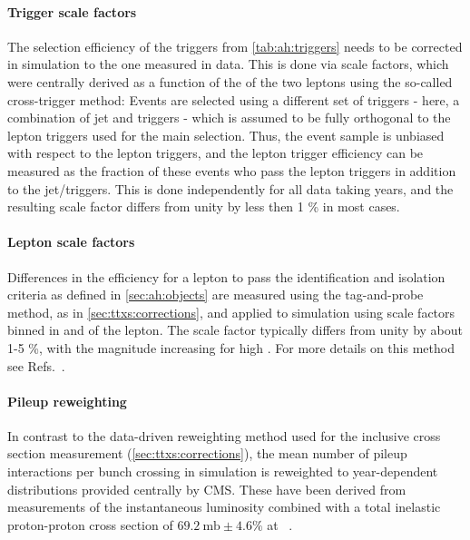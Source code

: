 \paragraph{Trigger scale factors}

The selection efficiency of the triggers from \cref{tab:ah:triggers} needs to be corrected in simulation to the one measured in data. This is done via scale factors, which were centrally derived as a function of the \pt of the two leptons using the so-called cross-trigger method: Events are selected using a different set of triggers - here, a combination of jet and \ptmiss triggers - which is assumed to be fully orthogonal to the lepton triggers used for the main selection. Thus, the event sample is unbiased with respect to the lepton triggers, and the lepton trigger efficiency can be measured as the fraction of these events who pass the lepton triggers in addition to the jet/\ptmiss triggers. This is done independently for all data taking years, and the resulting scale factor differs from unity by less then 1 \% in most cases.

\paragraph{Lepton scale factors}

Differences in the efficiency for a lepton to pass the identification and isolation criteria as defined in \cref{sec:ah:objects} are measured using the tag-and-probe method, as in \cref{sec:ttxs:corrections}, and applied to simulation using scale factors binned in \pt and \abseta of the lepton. The scale factor typically differs from unity by about 1-5 \%, with the magnitude increasing for high \abseta. For more details on this method see Refs.~\cite{CMS:EGM-17-001,CMS:MUO-16-001}.

\paragraph{Pileup reweighting}

In contrast to the data-driven reweighting method used for the inclusive \ttbar cross section measurement (\cref{sec:ttxs:corrections}), the mean number of pileup interactions per bunch crossing in simulation is reweighted to year-dependent distributions provided centrally by CMS. These have been derived from measurements of the instantaneous luminosity combined with a total inelastic proton-proton cross section of $\SI{69.2}{\milli\barn} \pm 4.6 \%$ at \sqrtsRII~\cite{CMS:LUM-17-003}.


